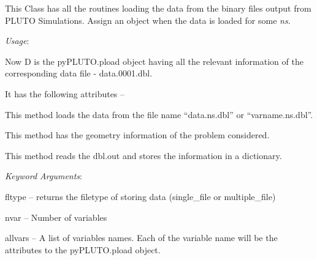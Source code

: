 \documentclass[letterpaper,10pt,english]{sphinxmanual}
\begin{document}
\begin{fulllineitems}
\label{pload:pyPLUTO.pload}
This Class has all the routines loading the data from the
binary files output from PLUTO Simulations. Assign an object
when the data is loaded for some \emph{ns}.

\emph{Usage}:




Now D is the pyPLUTO.pload object having all the relevant information
of the corresponding data file - data.0001.dbl.

It has the following attributes --

\begin{fulllineitems}
\label{pload:pyPLUTO.pload.data}
This method loads the data from the file name ``data.ns.dbl'' or ``varname.ns.dbl''.

\end{fulllineitems}


\begin{fulllineitems}
\label{pload:pyPLUTO.pload.geometry}
This method has the geometry information of the problem considered.

\end{fulllineitems}


\begin{fulllineitems}
\label{pload:pyPLUTO.pload.get_varinfo}
This method reads the dbl.out and stores the information in a dictionary.

\emph{Keyword Arguments}:

fltype -- returns the filetype of storing data (single\_file or multiple\_file)

nvar -- Number of variables

allvars -- A list of variables names. Each of the variable name will be the attributes to the pyPLUTO.pload object.

\end{fulllineitems}


\end{fulllineitems}
\end{document}
